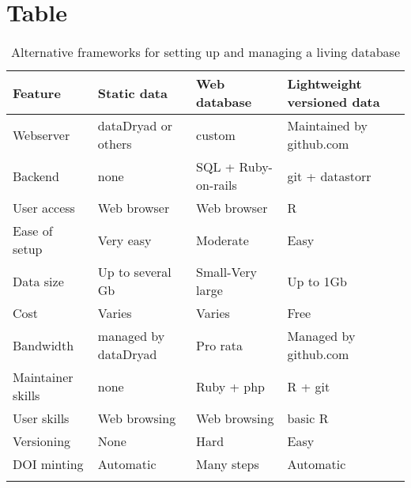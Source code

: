 \documentclass[a4paper,11pt]{article}
\begin{document}
\section{Table}

\begin{table}[h!]
\centering
\caption{Alternative frameworks for setting up and managing a living database}
{\footnotesize
\vspace{1cm}
  \begin{tabular}{p{2.5cm}p{3.5cm}p{3.5cm}p{4cm}}
  \hline
  \textbf{Feature} & \textbf{Static data}& \textbf{Web database} & \textbf{Lightweight versioned data}\\ 
  \hline
   Webserver        & dataDryad or others & custom                          &  Maintained by github.com\\
   Backend          & none & SQL + Ruby-on-rails 			& git + datastorr \\
   User access      & Web browser & Web browser 				    & R \\
   Ease of setup    & Very easy & Moderate 							& Easy\\ %
   Data size        &Up to several Gb & Small-Very large 				& Up to 1Gb\\
   Cost             &Varies & Varies  						& Free \\
   Bandwidth        &managed by dataDryad & Pro rata 						& Managed by github.com\\
   Maintainer skills &none & Ruby + php 					& R + git \\
   User skills      &Web browsing& Web browsing  					& basic R \\
   Versioning       &None& Hard 							& Easy \\
   DOI minting      &Automatic & Many steps 					& Automatic \\
  \hline 
  \\
 
  \end{tabular}
  } 
\label{tab:sql_v_versioneddata}
\end{table}

\newpage
\end{document}
